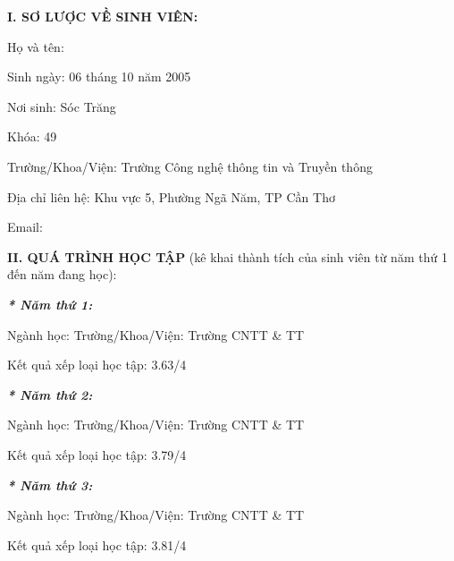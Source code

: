\begin{officialform}[Student]

\FormHeading
\StudentPhoto

\begingroup
\fontsize{12bp}{13.8bp}\selectfont
\setlength{\parindent}{0pt}

\noindent
    \textbf{I. SƠ LƯỢC VỀ SINH VIÊN:}\par
    Họ và tên: \PrincipalName\par
    Sinh ngày: 06 tháng 10 năm 2005\par
    Nơi sinh: Sóc Trăng\par
    Khóa: 49\par
    Trường/Khoa/Viện: Trường Công nghệ thông tin và Truyền thông\par
    Địa chỉ liên hệ: Khu vực 5, Phường Ngã Năm, TP Cần Thơ\par
    Email: \PrincipalEmail\par

\par\vspace{11.35bp}

\noindent\textbf{II. QUÁ TRÌNH HỌC TẬP} (kê khai thành tích của sinh viên từ năm thứ 1 đến năm đang học):\par

\noindent\textbf{\textit{* Năm thứ 1:}}\par

\hspace*{12bp}Ngành học: \PrincipalMajor\hfill Trường/Khoa/Viện: Trường CNTT \& TT\par

\hspace*{12bp}Kết quả xếp loại học tập: 3.63/4\par


\noindent\textbf{\textit{* Năm thứ 2:}}\par

\hspace*{12bp}Ngành học: \PrincipalMajor\hfill Trường/Khoa/Viện: Trường CNTT \& TT\par

\hspace*{12bp}Kết quả xếp loại học tập: 3.79/4\par


\noindent\textbf{\textit{* Năm thứ 3:}}\par

\hspace*{12bp}Ngành học: \PrincipalMajor\hfill Trường/Khoa/Viện: Trường CNTT \& TT\par

\hspace*{12bp}Kết quả xếp loại học tập: 3.81/4\par

\StudentSignature

\endgroup

\end{officialform}

